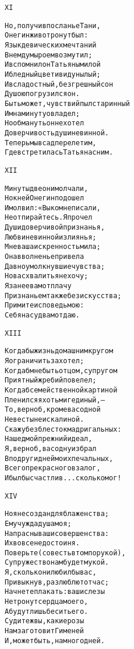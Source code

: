 \begin{minipage}[t]{\dimexpr 0.5\textwidth -\tabcolsep-.5pt}
\begin{alltt}\normalfont\centering
XI

Но, получив посланье Тани,
Онегин живо тронут был:
Язык девических мечтаний
В нем думы роем возмутил;
И вспомнил он Татьяны милой
И бледный цвет и вид унылый;
И в сладостный, безгрешный сон
Душою погрузился он.
Быть может, чувствий пыл старинный
Им на минуту овладел;
Но обмануть он не хотел
Доверчивость души невинной.
Теперь мы в сад перелетим,
Где встретилась Татьяна с ним.
\end{alltt}
\end{minipage}

\begin{minipage}[t]{\dimexpr 0.5\textwidth -\tabcolsep-.5pt}
\begin{alltt}\normalfont\centering
XII

Минуты две они молчали,
Но к ней Онегин подошел
И молвил: «Вы ко мне писали,
Не отпирайтесь. Я прочел
Души доверчивой признанья,
Любви невинной излиянья;
Мне ваша искренность мила;
Она в волненье привела
Давно умолкнувшие чувства;
Но вас хвалить я не хочу;
Я за нее вам отплачу
Признаньем также без искусства;
Примите исповедь мою:
Себя на суд вам отдаю.
\end{alltt}
\end{minipage}
\clearpage

\begin{minipage}[t]{\dimexpr 0.5\textwidth -\tabcolsep-.5pt}
\begin{alltt}\normalfont\centering
XIII

Когда бы жизнь домашним кругом
Я ограничить захотел;
Когда б мне быть отцом, супругом
Приятный жребий повелел;
Когда б семейственной картиной
Пленился я хоть миг единый, —
То, верно б, кроме вас одной
Невесты не искал иной.
Скажу без блесток мадригальных:
Нашед мой прежний идеал,
Я, верно б, вас одну избрал
В подруги дней моих печальных,
Всего прекрасного в залог,
И был бы счастлив... сколько мог!
\end{alltt}
\end{minipage}

\begin{minipage}[t]{\dimexpr 0.5\textwidth -\tabcolsep-.5pt}
\begin{alltt}\normalfont\centering
XIV

Но я не создан для блаженства;
Ему чужда душа моя;
Напрасны ваши совершенства:
Их вовсе недостоин я.
Поверьте (совесть в том порукой),
Супружество нам будет мукой.
Я, сколько ни любил бы вас,
Привыкнув, разлюблю тотчас;
Начнете плакать: ваши слезы
Не тронут сердца моего,
А будут лишь бесить его.
Судите ж вы, какие розы
Нам заготовит Гименей
И, может быть, на много дней.
\end{alltt}
\end{minipage}
\clearpage

